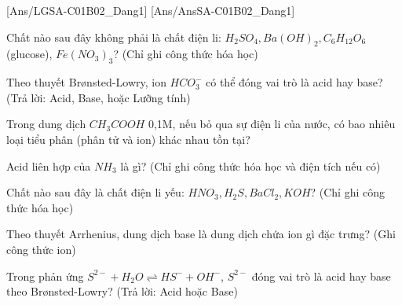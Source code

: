 [Ans/LGSA-C01B02_Dang1]
[Ans/AnsSA-C01B02_Dang1]
\begin{bt}
	Chất nào sau đây không phải là chất điện li: $H_2SO_4, Ba(OH)_2, C_6H_{12}O_6$ (glucose), $Fe(NO_3)_3$? (Chỉ ghi công thức hóa học)
\end{bt}
\begin{bt}
	Theo thuyết Brønsted-Lowry, ion $HCO_3^-$ có thể đóng vai trò là acid hay base? (Trả lời: Acid, Base, hoặc Lưỡng tính)
\end{bt}
\begin{bt}
	Trong dung dịch $CH_3COOH$ 0,1M, nếu bỏ qua sự điện li của nước, có bao nhiêu loại tiểu phân (phân tử và ion) khác nhau tồn tại?
\end{bt}
\begin{bt}
	Acid liên hợp của $NH_3$ là gì? (Chỉ ghi công thức hóa học và điện tích nếu có)
\end{bt}
\begin{bt}
	Chất nào sau đây là chất điện li yếu: $HNO_3, H_2S, BaCl_2, KOH$? (Chỉ ghi công thức hóa học)
\end{bt}
\begin{bt}
	Theo thuyết Arrhenius, dung dịch base là dung dịch chứa ion gì đặc trưng? (Ghi công thức ion)
\end{bt}
\begin{bt}
	Trong phản ứng $S^{2-} + H_2O \rightleftharpoons HS^- + OH^-$, $S^{2-}$ đóng vai trò là acid hay base theo Brønsted-Lowry? (Trả lời: Acid hoặc Base)
\end{bt}
